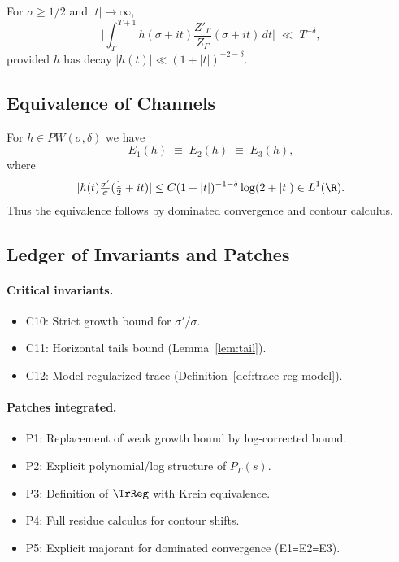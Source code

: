 \begin{lemma}
\label{lem:tail}
For $\sigma\geq 1/2$ and $|t|\to\infty$,
\[
\bigg|\int_{T}^{T+1} h(\sigma+it)\frac{Z'_\Gamma}{Z_\Gamma}(\sigma+it)\,dt\bigg|
\;\ll\; T^{-\delta},
\]
provided $h$ has decay $|h(t)|\ll (1+|t|)^{-2-\delta}$.
\end{lemma}

\subsection{Equivalence of Channels}
\label{subsec:e1e2e3-equivalence}

\begin{theorem}
\label{thm:e1e2e3}
For $h\in PW(\sigma,\delta)$ we have
\[
E_1(h) \;\equiv\; E_2(h) \;\equiv\; E_3(h),
\]
where
\[
|h(t)\tfrac{\sigma'}{\sigma}(\tfrac12+it)| \leq
C(1+|t|)^{-1-\delta}\log(2+|t|) \in L^1(\R).
\]
Thus the equivalence follows by dominated convergence and contour calculus.
\]
\end{theorem}

\subsection{Ledger of Invariants and Patches}
\label{subsec:ledger}

\paragraph{Critical invariants.}
\begin{itemize}
 \item C10: Strict growth bound for $\sigma'/\sigma$.
 \item C11: Horizontal tails bound (Lemma~\ref{lem:tail}).
 \item C12: Model-regularized trace (Definition~\ref{def:trace-reg-model}).
\end{itemize}

\paragraph{Patches integrated.}
\begin{itemize}
 \item P1: Replacement of weak growth bound by log-corrected bound.
 \item P2: Explicit polynomial/log structure of $P_\Gamma(s)$.
 \item P3: Definition of $\TrReg$ with Krein equivalence.
 \item P4: Full residue calculus for contour shifts.
 \item P5: Explicit majorant for dominated convergence (E1≡E2≡E3).
\end{itemize}

